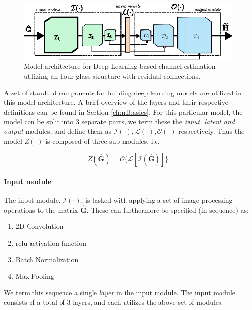 \begin{figure}
    \centering
    \includegraphics{chapters/part_uplink/figures/model_architecture.eps}
    \caption{Model architecture for Deep Learning based channel estimation utilizing an hour-glass structure with residual connections.}
    \label{fig:model_architecture_channel_estimation}
\end{figure}

A set of standard components for building deep learning models are utilized in this model architecture. A brief overview of the layers and their respective definitions can be found in Section \ref{ch:mlbasics}. For this particular model, the model can be split into 3 separate parts, we term these the \emph{input, latent and output} modules, and define them as $\mathcal{I}(\cdot), \mathcal{L}(\cdot), \mathcal{O}(\cdot)$ respectively. Thus the model $Z(\cdot)$ is composed of three sub-modules, i.e. 

\begin{equation}
    Z(\mathbf{\hat{G}}) = \mathcal{O}\{\mathcal{L}[\mathcal{I}(\mathbf{\hat{G}})]\}
\end{equation}

\paragraph{Input module}
The input module, $\mathcal{I}(\cdot)$, is tasked with applying a set of image processing operations to the matrix $\mathbf{\hat{G}}$. These can furthermore be specified (in sequence) as:

\begin{enumerate}
    \item $2$D Convolution
    \item \gls{relu} activation function
    \item Batch Normalization
    \item Max Pooling
\end{enumerate}

We term this sequence a single \emph{layer} in the input module. The input module consists of a total of $3$ layers, and each utilizes the above set of modules.

